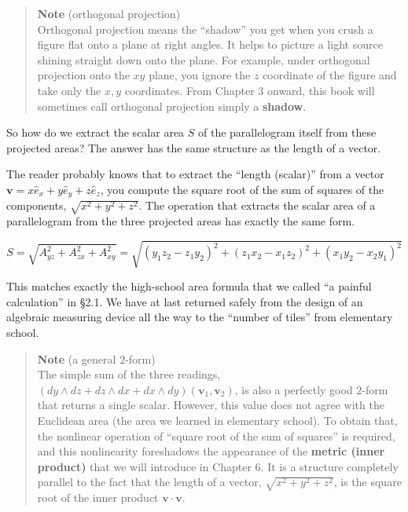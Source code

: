 \documentclass[a4paper,12pt,openany]{book}
\begin{document}
\begin{quote}
\textbf{Note} (orthogonal projection)\\
Orthogonal projection means the ``shadow'' you get when you crush a
figure flat onto a plane at right angles. It helps to picture a light
source shining straight down onto the plane. For example, under
orthogonal projection onto the \(xy\) plane, you ignore the \(z\)
coordinate of the figure and take only the \(x,y\) coordinates. From
Chapter 3 onward, this book will sometimes call orthogonal projection
simply a \textbf{shadow}.
\end{quote}

So how do we extract the scalar area \(S\) of the parallelogram itself
from these projected areas? The answer has the same structure as the
length of a vector.

The reader probably knows that to extract the ``length (scalar)'' from a
vector \(\mathbf{v} = x\hat{e}_x + y\hat{e}_y + z\hat{e}_z\), you
compute the square root of the sum of squares of the components,
\(\sqrt{x^2+y^2+z^2}\). The operation that extracts the scalar area of a
parallelogram from the three projected areas has exactly the same form.

\[S = \sqrt{A_{yz}^2 + A_{zx}^2 + A_{xy}^2} = \sqrt{(y_1 z_2 - z_1 y_2)^2 + (z_1 x_2 - x_1 z_2)^2 + (x_1 y_2 - x_2 y_1)^2}\]

This matches exactly the high-school area formula that we called ``a
painful calculation'' in §2.1. We have at last returned safely from the
design of an algebraic measuring device all the way to the ``number of
tiles'' from elementary school.

\begin{quote}
\textbf{Note} (a general \(2\)-form)\\
The simple sum of the three readings,
\((dy \wedge dz + dz \wedge dx + dx \wedge dy)(\mathbf{v}_1,\mathbf{v}_2)\),
is also a perfectly good \(2\)-form that returns a single scalar.
However, this value does not agree with the Euclidean area (the area we
learned in elementary school). To obtain that, the nonlinear operation
of ``square root of the sum of squares'' is required, and this
nonlinearity foreshadows the appearance of the
\textbf{metric (inner product)} that we will introduce in Chapter 6. It
is a structure completely parallel to the fact that the length of a
vector, \(\sqrt{x^2+y^2+z^2}\), is the square root of the inner product
\(\mathbf{v}\cdot\mathbf{v}\).
\end{quote}
\end{document}
